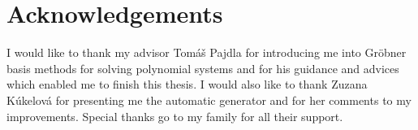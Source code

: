 \mbox{}\vfill

{\let\clearpage\relax\par \chapter*{Acknowledgements}}
I would like to thank my advisor Tom\'a\v s Pajdla for introducing me into Gr\"obner basis methods for solving polynomial systems and for his guidance and advices which enabled me to finish this thesis. I would also like to thank Zuzana K\'ukelov\'a for presenting me the automatic generator and for her comments to my improvements. Special thanks go to my family for all their support.
